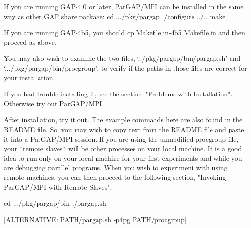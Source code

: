 If you are running GAP-4.0 or later, ParGAP/MPI can be installed in
the same way as other GAP share package:
\begintt
  cd .../pkg/pargap
  ./configure ../..
  make
\endtt

If you are running GAP-4b5, you should
\begintt
cp Makefile.in-4b5 Makefile.in
\endtt
and then proceed as above.

You may also wish to examine the two files,
`../pkg/pargap/bin/pargap.sh' and 
`.../pkg/pargap/bin/procgroup',
to verify if the paths in those files are correct for your installation.

If you had trouble installing it, see the section~"Problems with Installation".
Otherwise try out ParGAP/MPI.


After installation, try it out.  The example commands here are also
found in the README file.  So, you may wish to copy text from
the README file and paste it into a ParGAP/MPI session.
If you are using the unmodified procgroup file, your *remote slaves*
will be other processes on your local machine.  It is a good idea
to run only on your local machine for your first experiments and
while you are debugging parallel programs.  When you wish to
experiment with using remote machines, you can then proceed to the
following section, "Invoking ParGAP/MPI with Remote Slaves".


\beginexample
  cd .../pkg/pargap/bin
  ./pargap.sh

[ALTERNATIVE:  PATH/pargap.sh -p4pg PATH/procgroup]

